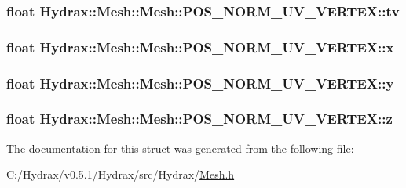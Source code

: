 \hypertarget{struct_hydrax_1_1_mesh_1_1_p_o_s___n_o_r_m___u_v___v_e_r_t_e_x_d2c28d211d1bd8a22dd53fdba0136b70}{
\subsubsection[{tv}]{\setlength{\rightskip}{0pt plus 5cm}float Hydrax::Mesh::Mesh::POS\_\-NORM\_\-UV\_\-VERTEX::tv}}
\label{struct_hydrax_1_1_mesh_1_1_p_o_s___n_o_r_m___u_v___v_e_r_t_e_x_d2c28d211d1bd8a22dd53fdba0136b70}


\hypertarget{struct_hydrax_1_1_mesh_1_1_p_o_s___n_o_r_m___u_v___v_e_r_t_e_x_3fd2778d7b1557d3ffe2cca87821050e}{
\subsubsection[{x}]{\setlength{\rightskip}{0pt plus 5cm}float Hydrax::Mesh::Mesh::POS\_\-NORM\_\-UV\_\-VERTEX::x}}
\label{struct_hydrax_1_1_mesh_1_1_p_o_s___n_o_r_m___u_v___v_e_r_t_e_x_3fd2778d7b1557d3ffe2cca87821050e}


\hypertarget{struct_hydrax_1_1_mesh_1_1_p_o_s___n_o_r_m___u_v___v_e_r_t_e_x_bdf65317315309866cf29cc769877eb8}{
\subsubsection[{y}]{\setlength{\rightskip}{0pt plus 5cm}float Hydrax::Mesh::Mesh::POS\_\-NORM\_\-UV\_\-VERTEX::y}}
\label{struct_hydrax_1_1_mesh_1_1_p_o_s___n_o_r_m___u_v___v_e_r_t_e_x_bdf65317315309866cf29cc769877eb8}


\hypertarget{struct_hydrax_1_1_mesh_1_1_p_o_s___n_o_r_m___u_v___v_e_r_t_e_x_411e0a89b12a32150632eb663aef89a1}{
\subsubsection[{z}]{\setlength{\rightskip}{0pt plus 5cm}float Hydrax::Mesh::Mesh::POS\_\-NORM\_\-UV\_\-VERTEX::z}}
\label{struct_hydrax_1_1_mesh_1_1_p_o_s___n_o_r_m___u_v___v_e_r_t_e_x_411e0a89b12a32150632eb663aef89a1}




The documentation for this struct was generated from the following file:\begin{CompactItemize}
\item 
C:/Hydrax/v0.5.1/Hydrax/src/Hydrax/\hyperlink{_mesh_8h}{Mesh.h}\end{CompactItemize}
